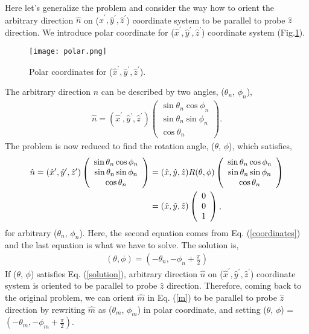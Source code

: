 Here let's generalize the problem and consider the way how to orient the arbitrary direction $\hat{n}$ on ($\hat{x}^\prime, \hat{y}^\prime, \hat{z}^\prime$) coordinate system
to be parallel to probe $\hat{z}$ direction.
We introduce polar coordinate for ($\hat{x}^\prime, \hat{y}^\prime, \hat{z}^\prime$) coordinate system (Fig.\ref{polar}).
\begin{figure}
  \centering
  \texttt{[image: polar.png]}
  \caption{Polar coordinates for ($\hat{x}^\prime, \hat{y}^\prime, \hat{z}^\prime$).}
  \label{polar}
\end{figure}
The arbitrary direction $\hat{n}$ can be described by two angles, ($\theta_n$, $\phi_n$),
\begin{align}
\hat{n} =
(\hat{x}^\prime, \hat{y}^\prime, \hat{z}^\prime)
\left(
\begin{array}{c}
\sin\theta_n\cos\phi_n \\
\sin\theta_n\sin\phi_n \\
\cos\theta_n
\end{array}
\right).
\end{align}
The problem is now reduced to find the rotation angle, ($\theta$, $\phi$), which satisfies,
\begin{align}
\hat{n} =
(\hat{x}^\prime, \hat{y}^\prime, \hat{z}^\prime)
\left(
\begin{array}{c}
\sin\theta_n\cos\phi_n \\
\sin\theta_n\sin\phi_n \\
\cos\theta_n
\end{array}
\right)
&= (\hat{x}, \hat{y}, \hat{z}) R(\theta, \phi)
\left(
\begin{array}{c}
\sin\theta_n\cos\phi_n \\
\sin\theta_n\sin\phi_n \\
\cos\theta_n
\end{array}
\right) \notag\\
&= (\hat{x}, \hat{y}, \hat{z})
\left(
\begin{array}{c}
0 \\
0 \\
1
\end{array}
\right),
\end{align}
for arbitrary ($\theta_n$, $\phi_n$).
Here, the second equation comes from Eq. (\ref{coordinates}) and the last equation is what we have to solve.
The solution is,
\begin{align}
\label{solution}
(\theta, \phi) = \left(-\theta_n, -\phi_n + \frac{\pi}{2}\right)
\end{align}
If ($\theta$, $\phi$) satisfies Eq. (\ref{solution}), arbitrary direction $\hat{n}$ on ($\hat{x}^\prime, \hat{y}^\prime, \hat{z}^\prime$) coordinate system
is oriented to be parallel to probe $\hat{z}$ direction.
Therefore, coming back to the original problem, we can orient $\hat{m}$ in Eq. (\ref{m}) to be parallel to probe $\hat{z}$ direction
by rewriting $\hat{m}$ as ($\theta_m$, $\phi_m$) in polar coordinate, and setting ($\theta$, $\phi$) = $\left(-\theta_m, -\phi_m+\frac{\pi}{2}\right)$.

